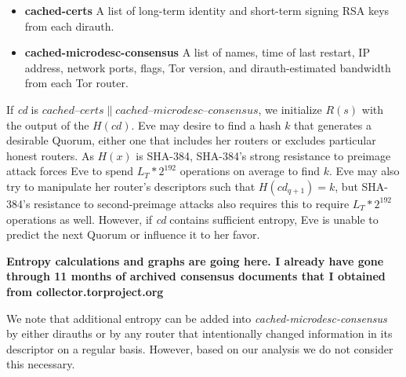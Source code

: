 \documentclass{sig-alternate}
\newcommand*\concat{\mathbin{\|}}
\begin{document}
\begin{itemize}[noitemsep,nolistsep]
	\item \textbf{cached-certs} A list of long-term identity and short-term signing RSA keys from each dirauth.
	\item \textbf{cached-microdesc-consensus} A list of names, time of last restart, IP address, network ports, flags, Tor version, and dirauth-estimated bandwidth from each Tor router.
\end{itemize}

If \emph{cd} is $ \mathit{cached \mbox{--} certs} \concat \mathit{cached \mbox{--} microdesc \mbox{--} consensus} $, we initialize $ \mathit{R}(s) $ with the output of the $ H(\mathit{cd}) $. Eve may desire to find a hash $ k $ that generates a desirable Quorum, either one that includes her routers or excludes particular honest routers. As $ H(x) $ is SHA-384, SHA-384's strong resistance to preimage attack forces Eve to spend $ L_{T} * 2^{192} $ operations on average to find $ k $. Eve may also try to manipulate her router's descriptors such that $ H(\mathit{cd}_{q+1}) = k $, but SHA-384's resistance to second-preimage attacks also requires this to require $ L_{T} * 2^{192} $ operations as well. However, if \emph{cd} contains sufficient entropy, Eve is unable to predict the next Quorum or influence it to her favor.

\textbf{Entropy calculations and graphs are going here. I already have gone through 11 months of archived consensus documents that I obtained from collector.torproject.org}

We note that additional entropy can be added into \emph{cached-microdesc-consensus} by either dirauths or by any router that intentionally changed information in its descriptor on a regular basis. However, based on our analysis we do not consider this necessary.

\end{document}
